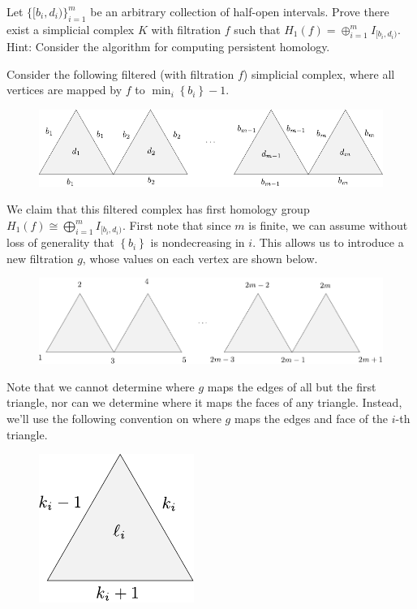 \documentclass[twoside,10pt]{article}
\begin{document}
\newpage

\begin{exer}
Let $\{[b_i, d_i)\}_{i=1}^m$ be an arbitrary collection of half-open intervals. Prove there exist a simplicial complex $K$ with filtration $f$ such that $H_1(f) = \oplus_{i=1}^m I_{[b_i, d_i)}$. Hint: Consider the algorithm for computing persistent homology. 
\end{exer}

Consider the following filtered (with filtration $f$) simplicial complex, where all vertices are mapped by $f$ to $\min_i\left\{ b_i \right\}- 1$.
\begin{figure}[H]
	\centering
	\includegraphics[scale=0.9]{fig/2a.pdf}
\end{figure}

We claim that this filtered complex has first homology group $H_1(f)\cong \bigoplus_{i=1}^{m}I_{[b_i,d_i)} $. First note that since $m$ is finite, we can assume without loss of generality that $\left\{ b_i \right\}$ is nondecreasing in $i$. This allows us to introduce a new filtration $g$, whose values on each vertex are shown below.

\begin{figure}[H]
	\centering
	\includegraphics[scale=0.9]{fig/2b.pdf}
\end{figure}

Note that we cannot determine where $g$ maps the edges of all but the first triangle, nor can we determine where it maps the faces of any triangle. Instead, we'll use the following convention on where $g$ maps the edges and face of the $i$-th triangle.

\begin{figure}[H]
	\centering
	\includegraphics[scale=1]{fig/2c.pdf}
\end{figure}
\end{document}
